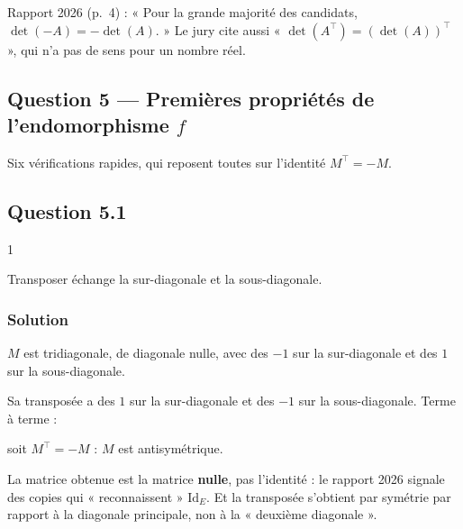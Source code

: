 \documentclass[11pt,a4paper]{article}
\newcommand{\equationajustee}[1]{%
  \sbox{\boiteequation}{$\displaystyle #1$}%
  \ifdim\wd\boiteequation>\linewidth
    \[\resizebox{\linewidth}{!}{\usebox{\boiteequation}}\]%
  \else
    \[#1\]%
  \fi}
\begin{document}
\begin{jury}

Rapport 2026 (p.~4) : « Pour la grande majorité des candidats, \(\det(-A)=-\det(A)\). » Le jury cite aussi « \(\det(A^\top)=(\det(A))^\top\) », qui n'a pas de sens pour un nombre réel.

\end{jury}

\hypertarget{question-5-premiuxe8res-propriuxe9tuxe9s-de-lendomorphisme-f}{%
\subsection{\texorpdfstring{Question 5 --- Premières propriétés de l'endomorphisme \(f\)}{Question 5 --- Premières propriétés de l'endomorphisme f}}\label{question-5-premiuxe8res-propriuxe9tuxe9s-de-lendomorphisme-f}}

Six vérifications rapides, qui reposent toutes sur l'identité \(M^\top=-M\).

\hypertarget{question-5.1}{%
\subsection{Question 5.1}\label{question-5.1}}

\begin{indication}{1}

Transposer échange la sur-diagonale et la sous-diagonale.

\end{indication}

\hypertarget{solution-4}{%
\subsubsection{Solution}\label{solution-4}}

\(M\) est tridiagonale, de diagonale nulle, avec des \(-1\) sur la sur-diagonale et des \(1\) sur la sous-diagonale.

Sa transposée a des \(1\) sur la sur-diagonale et des \(-1\) sur la sous-diagonale. Terme à terme :

\equationajustee{\boxed{M+M^\top=0_5}}

soit \(M^\top=-M\) : \(M\) est antisymétrique.

\begin{piege}

La matrice obtenue est la matrice \textbf{nulle}, pas l'identité : le rapport 2026 signale des copies qui « reconnaissent » \({\mathrm{Id}}_E\). Et la transposée s'obtient par symétrie par rapport à la diagonale principale, non à la « deuxième diagonale ».

\end{piege}
\end{document}
